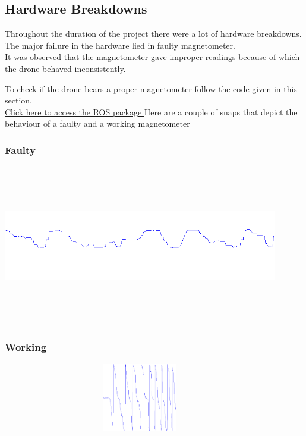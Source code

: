 \documentclass[a4paper,12pt,oneside]{book}
\begin{document}
\subsection{Hardware Breakdowns}
Throughout the duration of the project there were a lot of hardware breakdowns.\\
The major failure in the hardware lied in faulty magnetometer.\\
It was observed that the magnetometer gave improper readings because of which the drone behaved inconsistently.

To check if the drone bears a proper magnetometer follow the code given in this section.\\
\href{https://github.com/eYSIP-2018/Autotuning-of-Controller-For-Drone/tree/master/magnetometer_check}{Click here to access the ROS package }
Here are a couple of snaps that depict the behaviour of a faulty and a working magnetometer\\
\subsubsection{Faulty}
\includegraphics[width = 12cm , height= 7cm]{faulty.png}
\subsubsection{Working}
\includegraphics[width = 12cm , height= 3cm]{proper-mag.png}


\end{document}

